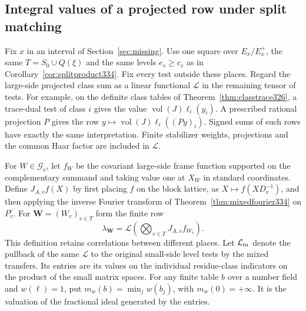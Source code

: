 \documentclass[a4paper,11pt]{article}
\theoremstyle{definition}
\theoremstyle{remark}
\numberwithin{equation}{section}
\begin{document}
\subsection{Integral values of a projected row under split matching}\label{sec:rowcontent335}

Fix \(x\) in an interval of Section~\ref{sec:missing}. Use one square over
\(E_x/E_x^+\), the same \(T=S_0\cup Q(\xi)\) and the same levels
\(e_v\ge c_v\) as in Corollary~\ref{cor:splitproduct334}. Fix every
test outside these places. Regard the large-side projected class sum
as a linear functional \(\mathcal L\) in the remaining tensor of tests.
For example, on the definite class tables of
Theorem~\ref{thm:classtrace326}, a trace-dual test of class \(i\) gives
the value \(\operatorname{vol}(J)\ell_i(y_i)\). A prescribed rational
projection \(P\) gives the row \(y\mapsto\operatorname{vol}(J)\ell_i((Py)_i)\).
Signed sums of such rows have exactly the same interpretation. Finite
stabilizer weights, projections and the common Haar factor are included
in \(\mathcal L\).

For \(W\in\mathcal G_v\), let \(f_W\) be the covariant large-side frame
function supported on the complementary summand and taking value one
at \(X_W\) in standard coordinates. Define
\(J_{A,v}f(X)\) by first placing \(f\) on the block lattice, as
\(X\mapsto f(XD_v^{-1})\), and then applying the inverse Fourier
transform of Theorem~\ref{thm:mixedfourier334} on \(P_v^c\).
For \(\mathbf W=(W_v)_{v\in T}\) form the finite row
\[
      \lambda_{\mathbf W}=
          \mathcal L\!\left(\bigotimes_{v\in T}J_{A,v} f_{W_v}\right).
\]
This definition retains correlations between different places. Let
\(\mathcal L_{\rm in}\) denote the pullback of the same \(\mathcal L\)
to the original small-side level tests by the mixed transfers.
Its entries are its values on the individual residue-class indicators
on the product of the small matrix spaces. For any finite table \(b\)
over a number field and \(w(\ell)=1\), put
\(m_w(b)=\min_j w(b_j)\), with \(m_w(0)=+\infty\).
It is the valuation of the fractional ideal generated by the entries.
\end{document}
